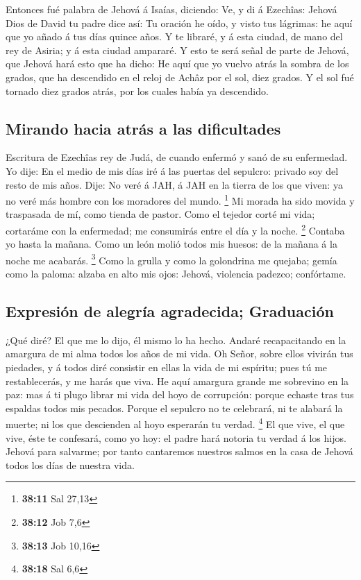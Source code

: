  Entonces fué palabra de Jehová á Isaías, diciendo:
 Ve, y di á Ezechîas: Jehová Dios de David tu padre dice
así: Tu oración he oído, y visto tus lágrimas: he aquí que yo añado á
tus días quince años.  Y te libraré, y á esta ciudad, de
mano del rey de Asiria; y á esta ciudad ampararé.  Y esto
te será señal de parte de Jehová, que Jehová hará esto que ha dicho:
 He aquí que yo vuelvo atrás la sombra de los grados, que
ha descendido en el reloj de Achâz por el sol, diez grados. Y el sol fué
tornado diez grados atrás, por los cuales había ya descendido.

\hypertarget{mirando-hacia-atruxe1s-a-las-dificultades}{%
\subsection{Mirando hacia atrás a las
dificultades}\label{mirando-hacia-atruxe1s-a-las-dificultades}}

 Escritura de Ezechîas rey de Judá, de cuando enfermó y
sanó de su enfermedad.  Yo dije: En el medio de mis días
iré á las puertas del sepulcro: privado soy del resto de mis años.
 Dije: No veré á JAH, á JAH en la tierra de los que
viven: ya no veré más hombre con los moradores del mundo. \footnote{\textbf{38:11}
  Sal 27,13}  Mi morada ha sido movida y traspasada de
mí, como tienda de pastor. Como el tejedor corté mi vida; cortaráme con
la enfermedad; me consumirás entre el día y la noche. \footnote{\textbf{38:12}
  Job 7,6}  Contaba yo hasta la mañana. Como un león
molió todos mis huesos: de la mañana á la noche me acabarás. \footnote{\textbf{38:13}
  Job 10,16}  Como la grulla y como la golondrina me
quejaba; gemía como la paloma: alzaba en alto mis ojos: Jehová,
violencia padezco; confórtame.

\hypertarget{expresiuxf3n-de-alegruxeda-agradecida-graduaciuxf3n}{%
\subsection{Expresión de alegría agradecida;
Graduación}\label{expresiuxf3n-de-alegruxeda-agradecida-graduaciuxf3n}}

 ¿Qué diré? El que me lo dijo, él mismo lo ha hecho.
Andaré recapacitando en la amargura de mi alma todos los años de mi
vida.  Oh Señor, sobre ellos vivirán tus piedades, y á
todos diré consistir en ellas la vida de mi espíritu; pues tú me
restablecerás, y me harás que viva.  He aquí amargura
grande me sobrevino en la paz: mas á ti plugo librar mi vida del hoyo de
corrupción: porque echaste tras tus espaldas todos mis pecados.
 Porque el sepulcro no te celebrará, ni te alabará la
muerte; ni los que descienden al hoyo esperarán tu verdad. \footnote{\textbf{38:18}
  Sal 6,6}  El que vive, el que vive, éste te confesará,
como yo hoy: el padre hará notoria tu verdad á los hijos.
 Jehová para salvarme; por tanto cantaremos nuestros
salmos en la casa de Jehová todos los días de nuestra vida.

